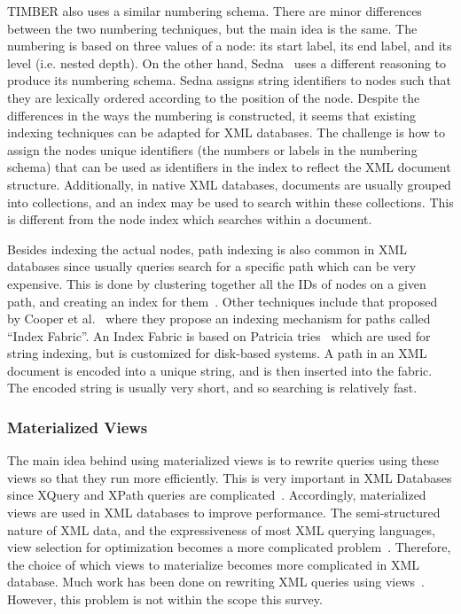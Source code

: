 \documentclass[12pt,a4paper]{article}
\begin{document}
TIMBER also uses a similar numbering schema. There are minor differences between the two numbering techniques, but the main idea is the same. The numbering is
based on three values of a node: its start label, its end label, and its level (i.e. nested depth). On the other hand, Sedna~\cite{taranov2010sedna} uses a
different reasoning to produce its numbering schema. Sedna assigns string identifiers to nodes such that they are lexically ordered according to the position
of the node. Despite the differences in the ways the numbering is constructed, it seems that existing indexing techniques can be adapted for XML databases. The
challenge is how to assign the nodes unique identifiers (the numbers or labels in the numbering schema) that can be used as identifiers in the index to
reflect the XML document structure. Additionally, in native XML databases, documents are usually grouped into collections, and an index may be used to search
within these collections. This is different from the node index which searches within a document.

Besides indexing the actual nodes, path indexing is also common in XML databases since usually queries search for a specific path which can be very expensive.
This is done by clustering together all the IDs of nodes on a given path, and creating an index for them~\cite{milo1999index, arion2008path}. Other techniques
include that proposed by Cooper et al.~\cite{cooper2001} where they propose an indexing mechanism for paths called ``Index Fabric''. An Index Fabric is based on
Patricia tries~\cite{knuth1998} which are used for string indexing, but is customized for disk-based systems. A path in an XML document is encoded into a unique
string, and is then inserted into the fabric. The encoded string is usually very short, and so searching is relatively fast.


\subsubsection{Materialized Views}

The main idea behind using materialized views is to rewrite queries using these views so that they run more efficiently. This is very important in XML
Databases since XQuery and XPath queries are complicated~\cite{arion2007structured}. Accordingly, materialized views are used in XML databases to improve
performance. The semi-structured nature of
XML data, and the expressiveness of most XML querying languages, view selection for optimization becomes a more complicated
problem~\cite{tang2009materialized}. Therefore, the choice of which views to materialize becomes more complicated in XML database. Much work has been
done on rewriting XML queries using views~\cite{arion2007structured, balmin2004framework, aouiche2006clustering, tang2008multiple}. However, this problem is not
within the scope this survey.
\end{document}

